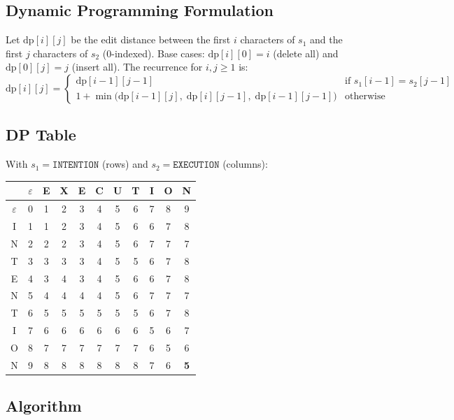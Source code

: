 \documentclass[12pt,a4paper]{article}
\begin{document}
\subsection*{Dynamic Programming Formulation}

Let $\text{dp}[i][j]$ be the edit distance between the first $i$ characters of $s_1$ and the first $j$ characters of $s_2$ (0-indexed). Base cases: $\text{dp}[i][0] = i$ (delete all) and $\text{dp}[0][j] = j$ (insert all). The recurrence for $i, j \ge 1$ is:
\[
    \text{dp}[i][j] = \begin{cases}
        \text{dp}[i-1][j-1] & \text{if } s_1[i-1] = s_2[j-1] \\[4pt]
        1 + \min\!\big(\text{dp}[i-1][j],\; \text{dp}[i][j-1],\; \text{dp}[i-1][j-1]\big) & \text{otherwise}
    \end{cases}
\]

\subsection*{DP Table}

With $s_1 = \texttt{INTENTION}$ (rows) and $s_2 = \texttt{EXECUTION}$ (columns):

\begin{center}
\small
\begin{tabular}{c|cccccccccc}
    & $\varepsilon$ & E & X & E & C & U & T & I & O & N \\ \hline
    $\varepsilon$ & 0 & 1 & 2 & 3 & 4 & 5 & 6 & 7 & 8 & 9 \\
    I & 1 & 1 & 2 & 3 & 4 & 5 & 6 & 6 & 7 & 8 \\
    N & 2 & 2 & 2 & 3 & 4 & 5 & 6 & 7 & 7 & 7 \\
    T & 3 & 3 & 3 & 3 & 4 & 5 & 5 & 6 & 7 & 8 \\
    E & 4 & 3 & 4 & 3 & 4 & 5 & 6 & 6 & 7 & 8 \\
    N & 5 & 4 & 4 & 4 & 4 & 5 & 6 & 7 & 7 & 7 \\
    T & 6 & 5 & 5 & 5 & 5 & 5 & 5 & 6 & 7 & 8 \\
    I & 7 & 6 & 6 & 6 & 6 & 6 & 6 & 5 & 6 & 7 \\
    O & 8 & 7 & 7 & 7 & 7 & 7 & 7 & 6 & 5 & 6 \\
    N & 9 & 8 & 8 & 8 & 8 & 8 & 8 & 7 & 6 & \textbf{5} \\
\end{tabular}
\end{center}
\subsection*{Algorithm}
\end{document}
